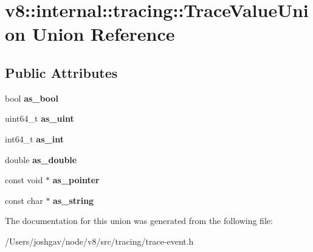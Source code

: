 \hypertarget{unionv8_1_1internal_1_1tracing_1_1_trace_value_union}{}\section{v8\+:\+:internal\+:\+:tracing\+:\+:Trace\+Value\+Union Union Reference}
\label{unionv8_1_1internal_1_1tracing_1_1_trace_value_union}
\subsection*{Public Attributes}
\begin{DoxyCompactItemize}
\item 
bool {\bfseries as\+\_\+bool}\hypertarget{unionv8_1_1internal_1_1tracing_1_1_trace_value_union_a38413189f5a75cd4119cf504653c3481}{}\label{unionv8_1_1internal_1_1tracing_1_1_trace_value_union_a38413189f5a75cd4119cf504653c3481}

\item 
uint64\+\_\+t {\bfseries as\+\_\+uint}\hypertarget{unionv8_1_1internal_1_1tracing_1_1_trace_value_union_ad11198e60268d8626af2e8c85f6e0974}{}\label{unionv8_1_1internal_1_1tracing_1_1_trace_value_union_ad11198e60268d8626af2e8c85f6e0974}

\item 
int64\+\_\+t {\bfseries as\+\_\+int}\hypertarget{unionv8_1_1internal_1_1tracing_1_1_trace_value_union_a3874636cd1e342e41e56ae390c9240e8}{}\label{unionv8_1_1internal_1_1tracing_1_1_trace_value_union_a3874636cd1e342e41e56ae390c9240e8}

\item 
double {\bfseries as\+\_\+double}\hypertarget{unionv8_1_1internal_1_1tracing_1_1_trace_value_union_a3de904df25527d61b0fd711a0c933e67}{}\label{unionv8_1_1internal_1_1tracing_1_1_trace_value_union_a3de904df25527d61b0fd711a0c933e67}

\item 
const void $\ast$ {\bfseries as\+\_\+pointer}\hypertarget{unionv8_1_1internal_1_1tracing_1_1_trace_value_union_a915fa1bb0ed9e41bcf441353a2c14340}{}\label{unionv8_1_1internal_1_1tracing_1_1_trace_value_union_a915fa1bb0ed9e41bcf441353a2c14340}

\item 
const char $\ast$ {\bfseries as\+\_\+string}\hypertarget{unionv8_1_1internal_1_1tracing_1_1_trace_value_union_a6d3c177ea8d9a2909e7d88c535976bde}{}\label{unionv8_1_1internal_1_1tracing_1_1_trace_value_union_a6d3c177ea8d9a2909e7d88c535976bde}

\end{DoxyCompactItemize}


The documentation for this union was generated from the following file\+:\begin{DoxyCompactItemize}
\item 
/\+Users/joshgav/node/v8/src/tracing/trace-\/event.\+h\end{DoxyCompactItemize}
